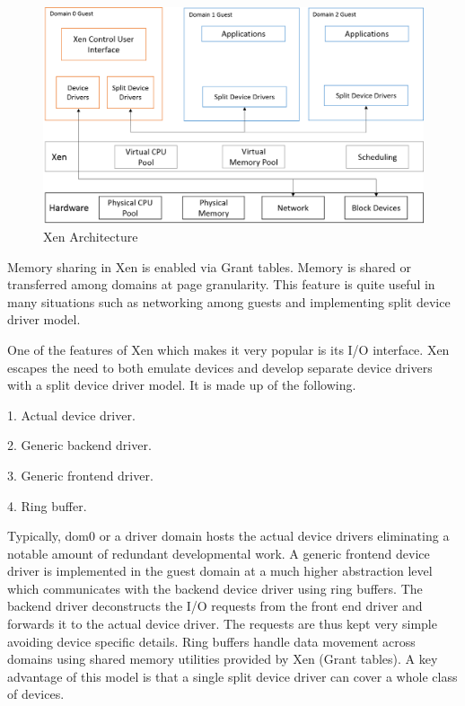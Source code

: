 \begin{figure}[H]
\centering
\includegraphics[scale=0.6]{figures/Xen_model.png}
\caption[Xen Architecture]{Xen Architecture \cite{chisnall_book}}
\label{fig:xen_model}
\end{figure}
Memory sharing in Xen is enabled via Grant tables. Memory is shared or transferred among domains at page granularity. This feature is quite useful in many situations such as networking among guests and implementing split device driver model.

One of the features of Xen which makes it very popular is its I/O interface. Xen escapes the need to both emulate devices and develop separate device drivers with a split device driver model. It is made up of the following.

1. Actual device driver.

2. Generic backend driver.

3. Generic frontend driver.

4. Ring buffer.

Typically, dom0 or a driver domain hosts the actual device drivers eliminating a notable amount of redundant developmental work. A generic frontend device driver is implemented in the guest domain at a much higher abstraction level which communicates with the backend device driver using ring buffers. The backend driver deconstructs the I/O requests from the front end driver and forwards it to the actual device driver. The requests are thus kept very simple avoiding device specific details. Ring buffers handle data movement across domains using shared memory utilities provided by Xen (Grant tables). A key advantage of this model is that a single split device driver can cover a whole class of devices.

